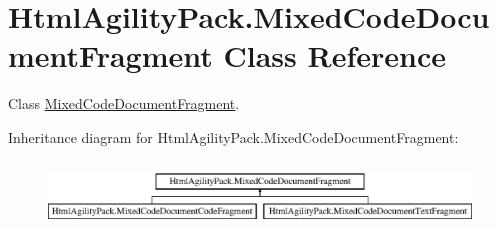 \hypertarget{class_html_agility_pack_1_1_mixed_code_document_fragment}{}\section{Html\+Agility\+Pack.\+Mixed\+Code\+Document\+Fragment Class Reference}
\label{class_html_agility_pack_1_1_mixed_code_document_fragment}


Class \hyperlink{class_html_agility_pack_1_1_mixed_code_document_fragment}{Mixed\+Code\+Document\+Fragment}.  


Inheritance diagram for Html\+Agility\+Pack.\+Mixed\+Code\+Document\+Fragment\+:\begin{figure}[H]
\begin{center}
\leavevmode
\includegraphics[height=1.783440cm]{class_html_agility_pack_1_1_mixed_code_document_fragment}
\end{center}
\end{figure}
